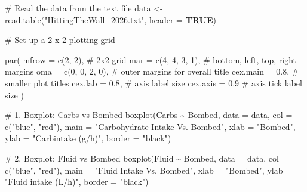 \documentclass[
]{article}
\newenvironment{Shaded}{\begin{snugshade}}{\end{snugshade}}
\newcommand{\AttributeTok}[1]{\textcolor[rgb]{0.16,0.50,0.73}{#1}}
\newcommand{\CommentTok}[1]{\textcolor[rgb]{0.48,0.49,0.49}{#1}}
\newcommand{\ConstantTok}[1]{\textcolor[rgb]{0.15,0.68,0.68}{\textbf{#1}}}
\newcommand{\DecValTok}[1]{\textcolor[rgb]{0.96,0.45,0.00}{#1}}
\newcommand{\FloatTok}[1]{\textcolor[rgb]{0.96,0.45,0.00}{#1}}
\newcommand{\FunctionTok}[1]{\textcolor[rgb]{0.56,0.27,0.68}{#1}}
\newcommand{\NormalTok}[1]{\textcolor[rgb]{0.81,0.81,0.76}{#1}}
\newcommand{\OtherTok}[1]{\textcolor[rgb]{0.15,0.68,0.38}{#1}}
\newcommand{\SpecialCharTok}[1]{\textcolor[rgb]{0.24,0.68,0.91}{#1}}
\newcommand{\StringTok}[1]{\textcolor[rgb]{0.96,0.31,0.31}{#1}}
\begin{document}
\begin{Shaded}
\begin{Highlighting}[]
\CommentTok{\# Read the data from the text file}
\NormalTok{data }\OtherTok{\textless{}{-}} \FunctionTok{read.table}\NormalTok{(}\StringTok{"HittingTheWall\_2026.txt"}\NormalTok{, }\AttributeTok{header =} \ConstantTok{TRUE}\NormalTok{)}


\CommentTok{\# Set up a 2 x 2 plotting grid}

\FunctionTok{par}\NormalTok{(}
  \AttributeTok{mfrow =} \FunctionTok{c}\NormalTok{(}\DecValTok{2}\NormalTok{, }\DecValTok{2}\NormalTok{),          }\CommentTok{\# 2x2 grid}
  \AttributeTok{mar   =} \FunctionTok{c}\NormalTok{(}\DecValTok{4}\NormalTok{, }\DecValTok{4}\NormalTok{, }\DecValTok{3}\NormalTok{, }\DecValTok{1}\NormalTok{),    }\CommentTok{\# bottom, left, top, right margins}
  \AttributeTok{oma   =} \FunctionTok{c}\NormalTok{(}\DecValTok{0}\NormalTok{, }\DecValTok{0}\NormalTok{, }\DecValTok{2}\NormalTok{, }\DecValTok{0}\NormalTok{),    }\CommentTok{\# outer margins for overall title}
  \AttributeTok{cex.main =} \FloatTok{0.8}\NormalTok{,          }\CommentTok{\# smaller plot titles}
  \AttributeTok{cex.lab  =} \FloatTok{0.8}\NormalTok{,          }\CommentTok{\# axis label size}
  \AttributeTok{cex.axis =} \FloatTok{0.9}            \CommentTok{\# axis tick label size}
\NormalTok{)}


\CommentTok{\# 1. Boxplot: Carbs vs Bombed}
\FunctionTok{boxplot}\NormalTok{(Carbs }\SpecialCharTok{\textasciitilde{}}\NormalTok{ Bombed,}
        \AttributeTok{data =}\NormalTok{ data,}
        \AttributeTok{col =} \FunctionTok{c}\NormalTok{(}\StringTok{"blue"}\NormalTok{, }\StringTok{"red"}\NormalTok{),}
        \AttributeTok{main =} \StringTok{"Carbohydrate Intake Vs. Bombed"}\NormalTok{,}
        \AttributeTok{xlab =} \StringTok{"Bombed"}\NormalTok{,}
        \AttributeTok{ylab =} \StringTok{"Carbintake (g/h)"}\NormalTok{,}
        \AttributeTok{border =} \StringTok{"black"}\NormalTok{)}

\CommentTok{\# 2. Boxplot: Fluid vs Bombed}
\FunctionTok{boxplot}\NormalTok{(Fluid }\SpecialCharTok{\textasciitilde{}}\NormalTok{ Bombed,}
        \AttributeTok{data =}\NormalTok{ data,}
        \AttributeTok{col =} \FunctionTok{c}\NormalTok{(}\StringTok{"blue"}\NormalTok{, }\StringTok{"red"}\NormalTok{),}
        \AttributeTok{main =} \StringTok{"Fluid Intake Vs. Bombed"}\NormalTok{,}
        \AttributeTok{xlab =} \StringTok{"Bombed"}\NormalTok{,}
        \AttributeTok{ylab =} \StringTok{"Fluid intake (L/h)"}\NormalTok{,}
        \AttributeTok{border =} \StringTok{"black"}\NormalTok{)}


\end{Highlighting}
\end{Shaded}
\end{document}
